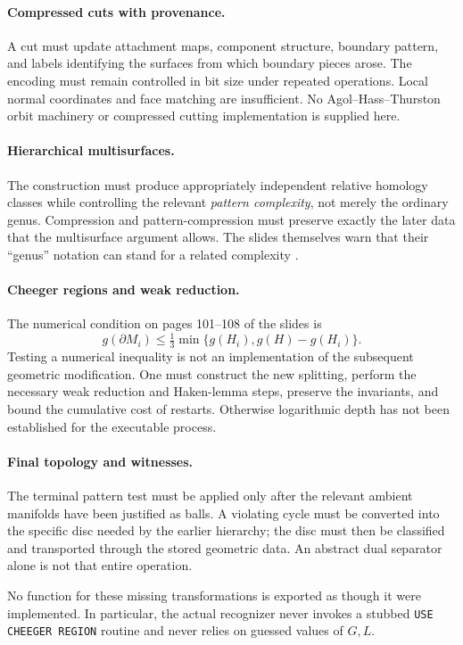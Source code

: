 \documentclass[11pt]{article}
\newcommand{\code}[1]{\texttt{#1}}
\begin{document}
\paragraph{Compressed cuts with provenance.}
A cut must update attachment maps, component structure, boundary pattern, and
labels identifying the surfaces from which boundary pieces arose. The encoding
must remain controlled in bit size under repeated operations. Local normal
coordinates and face matching are insufficient. No Agol--Hass--Thurston orbit
machinery or compressed cutting implementation is supplied here.

\paragraph{Hierarchical multisurfaces.}
The construction must produce appropriately independent relative homology
classes while controlling the relevant \emph{pattern complexity}, not merely
the ordinary genus. Compression and pattern-compression must preserve exactly
the later data that the multisurface argument allows. The slides themselves
warn that their ``genus'' notation can stand for a related complexity
\cite[p.~54]{slides}.

\paragraph{Cheeger regions and weak reduction.}
The numerical condition on pages 101--108 of the slides is
\[
 g(\partial M_i)\leq\tfrac13\min\{g(H_i),g(H)-g(H_i)\}.
\]
Testing a numerical inequality is not an implementation of the subsequent
geometric modification. One must construct the new splitting, perform the
necessary weak reduction and Haken-lemma steps, preserve the invariants, and
bound the cumulative cost of restarts. Otherwise logarithmic depth has not been
established for the executable process.

\paragraph{Final topology and witnesses.}
The terminal pattern test must be applied only after the relevant ambient
manifolds have been justified as balls. A violating cycle must be converted
into the specific disc needed by the earlier hierarchy; the disc must then be
classified and transported through the stored geometric data. An abstract dual
separator alone is not that entire operation.

No function for these missing transformations is exported as though it were
implemented. In particular, the actual recognizer never invokes a stubbed
\code{USE CHEEGER REGION} routine and never relies on guessed values of $G,L$.
\end{document}
